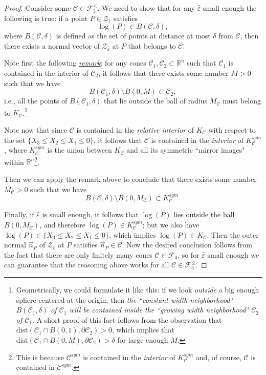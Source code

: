\documentclass[12pt,letterpaper]{article}
\newcommand{\C}{\mathcal{C}}
\newcommand{\F}{\mathcal{F}}
\newcommand{\Z}{\mathcal{Z}}
\newcommand{\RR}{\mathbb{R}}
\newcommand{\eps}{\varepsilon}
\newcommand{\dist}{\mathrm{dist}}
\begin{document}
\begin{proof}
Consider some $\C \in \F_3^\le$. 
We need to show that for any $\hat\eps$ small enough the following is true: if a point $P \in \Z_{\hat\eps}$ satisfies 
$$
\log(P) \in B(\C, \delta),
$$ 
where $B(\C, \delta)$ is defined as the set of points at  distance at most $\delta$ from $\C$,  then there exists a normal vector of $\Z_{\hat\eps}$ at $P$ that belongs to $\C$. 

Note first the following \underline{\em remark}: for any cones $\C_1, \C_2 \subset \RR^n$ such that $\C_1$ is contained in the interior of $\C_2$, it follows that there exists some number $M>0$ such that we have 
$$
B(\C_1, \delta) \setminus B(0, M) \subset  \C_2,
$$
i.e., all the points of $B(\C_1, \delta)$  that lie outside the ball of radius $M_\C$ must belong to $K_\C$.\footnote{Geometrically, we could formulate it like this: if we look {\em outside} a big enough sphere centered at the origin, then {\em the ``constant width neighborhood" $B(\C_1, \delta)$ of $\C_1$ will be contained inside the ``growing width neighborhood" $\C_2$ of $\C_1$}. A short proof of this fact follows from the observation that $\dist(\C_1 \cap B(0, 1), \partial \C_2) > 0$, which implies that $\dist(\C_1 \cap B(0, M), \partial \C_2) > \delta$ for large enough $M$.}

Note now that since $\C$ is contained in the {\em relative interior} of $K_\C$ with respect to the set $\{ X_3 \le X_2 \le X_1 \le 0 \}$, it follows that $\C$ is contained in the {\em interior} of $K_\C^{sym}$, where  $K_\C^{sym}$ is the union between $K_\C$ and all its symmetric ``mirror images" within $\RR^n$\footnote{This is because $\C^{sym}$ is contained in the {\em interior} of $K_\C^{sym}$ and, of course, $\C$ is contained in $\C^{sym}$.}. 

Then we can apply the remark above to conclude that there exists some number $M_\C>0$ such that we have 
$$
B(\C, \delta) \setminus B(0, M_\C) \subset  K_\C^{sym}.
$$

Finally, if $\hat\eps$ is small enough, it follows that $\log(P)$ lies outside the ball $B(0, M_\C)$, and therefore $\log(P) \in K_\C^{sym}$; but we also have $\log(P) \in \{ X_3 \le X_2 \le X_1 \le 0 \}$, which implies $\log(P) \in K_\C$. Then  the outer normal $\vec{n}_P$ of $\Z_{\hat\eps}$ at $P$ satisfies $\vec{n}_P \in \C$.
Now the desired conclusion follows from the fact that there are only finitely many cones $\C \in \F_3$, so for $\hat\eps$ small enough we can guarantee that the reasoning above works  for all $\C \in \F_3^\le$.
\end{proof}
\end{document}
